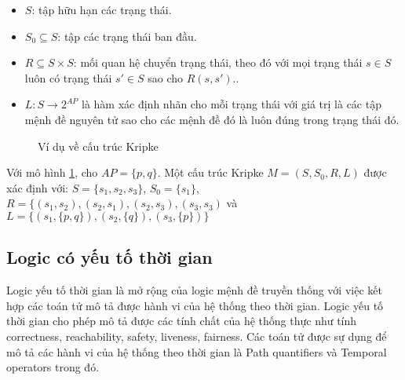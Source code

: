 \begin{itemize}
\item{$S$: tập hữu hạn các trạng thái.}
\item{$S_0 \subseteq S$: tập các trạng thái ban đầu.}
\item{$R \subseteq S \times S$: mối quan hệ chuyển trạng thái, theo đó với mọi trạng thái $s \in S$ luôn có trạng thái $s' \in S$ sao cho $R(s, s')$..}
\item{$L: S \rightarrow 2^{AP}$ là hàm xác định nhãn cho mỗi trạng thái với giá trị là các tập mệnh đề nguyên tử sao cho các mệnh đề đó là luôn đúng trong trạng thái đó.}
\end{itemize}

\begin{figure}
\centering
{}
\caption{Ví dụ về cấu trúc Kripke}
\label{fig:KripkeStruct}
\end{figure}

\hspace{0.5cm}Với mô hình \ref {fig:KripkeStruct}, cho $AP = \lbrace p,q\rbrace$. Một cấu trúc Kripke $M = (S, S_0, R, L)$ được xác định với: $S = \lbrace s_1, s_2, s_3 \rbrace$, $S_0 = \lbrace s_1 \rbrace$, $R = \lbrace (s_1, s_2), (s_2, s_1), (s_2, s_3), (s_3, s_3)$ và $L = \lbrace (s_1,\lbrace p,q \rbrace), (s_2,\lbrace q \rbrace), (s_3,\lbrace p \rbrace) \rbrace$	 

\subsection{Logic có yếu tố thời gian}

\hspace{0.5cm}Logic yếu tố thời gian là mở rộng của logic mệnh đề truyền thống với việc kết hợp các toán tử mô tả được hành vi của hệ thống theo thời gian. Logic yếu tố thời gian cho phép mô tả được các tính chất của hệ thống thực như tính correctness, reachability, safety, liveness, fairness. Các toán tử được sự dụng để mô tả các hành vi của hệ thống theo thời gian là Path quantifiers và Temporal operators trong đó.

